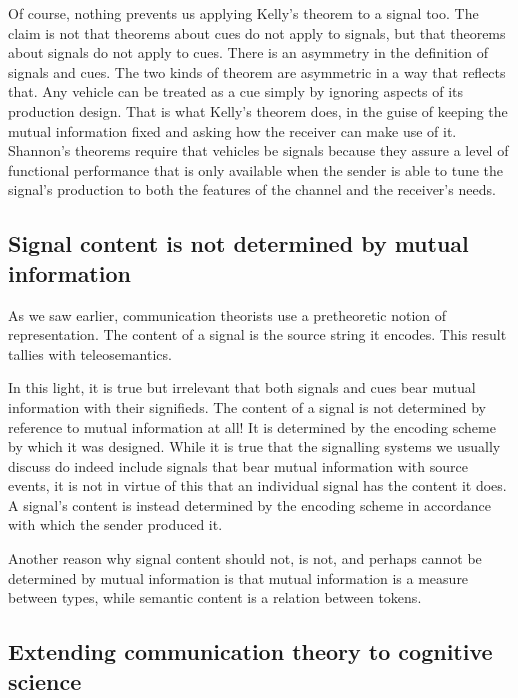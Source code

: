 Of course, nothing prevents us applying Kelly's theorem to a signal too.
The claim is not that theorems about cues do not apply to signals, but that theorems about signals do not apply to cues.
There is an asymmetry in the definition of signals and cues.
The two kinds of theorem are asymmetric in a way that reflects that.
Any vehicle can be treated as a cue simply by ignoring aspects of its production design.
That is what Kelly's theorem does, in the guise of keeping the mutual information fixed and asking how the receiver can make use of it.
Shannon's theorems require that vehicles be signals because they assure a level of functional performance that is only available when the sender is able to tune the signal's production to both the features of the channel and the receiver's needs.

\subsection{Signal content is not determined by mutual information}

As we saw earlier, communication theorists use a pretheoretic notion of representation.
The content of a signal is the source string it encodes.
This result tallies with teleosemantics.

In this light, it is true but irrelevant that both signals and cues bear mutual information with their signifieds. 
The content of a signal is not determined by reference to mutual information at all!
It is determined by the encoding scheme by which it was designed.
While it is true that the signalling systems we usually discuss do indeed include signals that bear mutual information with source events, it is not in virtue of this that an individual signal has the content it does.
A signal's content is instead determined by the encoding scheme in accordance with which the sender produced it.

Another reason why signal content should not, is not, and perhaps cannot be determined by mutual information is that mutual information is a measure between types, while semantic content is a relation between tokens.



\subsection{Extending communication theory to cognitive science}

